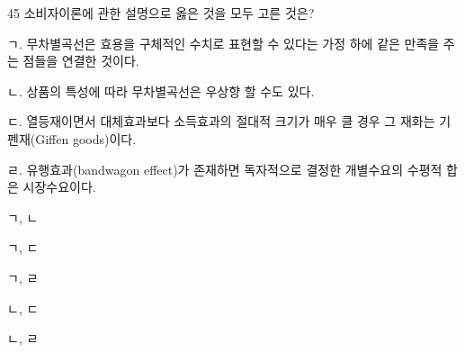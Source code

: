 \begin{question}{45}
소비자이론에 관한 설명으로 옳은 것을 모두 고른 것은?
\begin{framedtext}
ㄱ. 무차별곡선은 효용을 구체적인 수치로 표현할 수 있다는 가정 하에 같은 만족을 주는 점들을 연결한 것이다. \par
ㄴ. 상품의 특성에 따라 무차별곡선은 우상향 할 수도 있다. \par
ㄷ. 열등재이면서 대체효과보다 소득효과의 절대적 크기가 매우 클 경우 그 재화는 기펜재(Giffen goods)이다. \par
ㄹ. 유행효과(bandwagon effect)가 존재하면 독자적으로 결정한 개별수요의 수평적 합은 시장수요이다. \par
\end{framedtext}
\begin{choices}
  \item ㄱ, ㄴ
  \item ㄱ, ㄷ
  \item ㄱ, ㄹ
  \item ㄴ, ㄷ
  \item ㄴ, ㄹ
\end{choices}
\end{question}
